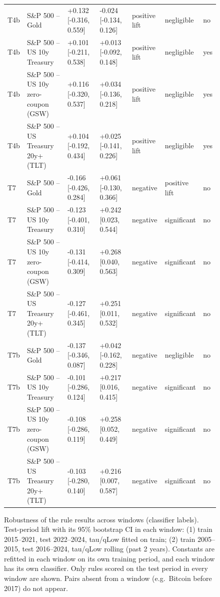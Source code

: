 \begin{figure}[t]
{\begin{tabular}{lllllll}
T4b & S\&P 500 -- Gold & +0.132 [-0.316, 0.559] & -0.024 [-0.134, 0.126] & positive lift & negligible & no \\
T4b & S\&P 500 -- US 10y Treasury & +0.101 [-0.211, 0.538] & +0.013 [-0.092, 0.148] & positive lift & negligible & yes \\
T4b & S\&P 500 -- US 10y zero-coupon (GSW) & +0.116 [-0.320, 0.537] & +0.034 [-0.136, 0.218] & positive lift & negligible & yes \\
T4b & S\&P 500 -- US Treasury 20y+ (TLT) & +0.104 [-0.192, 0.434] & +0.025 [-0.141, 0.226] & positive lift & negligible & yes \\
T7 & S\&P 500 -- Gold & -0.166 [-0.426, 0.284] & +0.061 [-0.130, 0.366] & negative & positive lift & no \\
T7 & S\&P 500 -- US 10y Treasury & -0.123 [-0.401, 0.310] & +0.242 [0.023, 0.544] & negative & significant & no \\
T7 & S\&P 500 -- US 10y zero-coupon (GSW) & -0.131 [-0.414, 0.309] & +0.268 [0.040, 0.563] & negative & significant & no \\
T7 & S\&P 500 -- US Treasury 20y+ (TLT) & -0.127 [-0.461, 0.345] & +0.251 [0.011, 0.532] & negative & significant & no \\
T7b & S\&P 500 -- Gold & -0.137 [-0.346, 0.087] & +0.042 [-0.162, 0.228] & negative & negligible & no \\
T7b & S\&P 500 -- US 10y Treasury & -0.101 [-0.286, 0.124] & +0.217 [0.016, 0.415] & negative & significant & no \\
T7b & S\&P 500 -- US 10y zero-coupon (GSW) & -0.108 [-0.286, 0.119] & +0.258 [0.052, 0.449] & negative & significant & no \\
T7b & S\&P 500 -- US Treasury 20y+ (TLT) & -0.103 [-0.280, 0.140] & +0.216 [0.007, 0.587] & negative & significant & no \\
\bottomrule
\end{tabular}
}
\caption{Robustness of the rule results across windows (classifier labels). Test-period lift with its 95\% bootstrap CI in each window: (1) train 2015–2021, test 2022–2024, tau/qLow fitted on train; (2) train 2005–2015, test 2016–2024, tau/qLow rolling (past 2 years). Constants are refitted in each window on its own training period, and each window has its own classifier. Only rules scored on the test period in every window are shown. Pairs absent from a window (e.g.\ Bitcoin before 2017) do not appear.}
\label{tab:robustness_classifier}
\end{figure}
